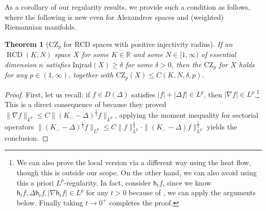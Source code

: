 \documentclass[11pt,reqno]{amsart}
\newtheorem{theorem}{Theorem}[section]
\theoremstyle{definition}
\numberwithin{equation}{section}
\DeclareMathOperator{\RCD}{RCD}
\begin{document}
As a corollary of our regularity results, we provide such a condition as follows, where the following is new even for Alexandrov spaces and (weighted) Riemannian manifolds.
\begin{theorem}[$\mathrm{CZ}_p$ for RCD spaces with positive injectivity radius]\label{thmcz}
    If an $\RCD(K, N)$ space $X$ for some $K \in \mathbb{R}$ and some $N \in [1, \infty)$ of essential dimension $n$ satisfies
    $
        \mathrm{Injrad}(X)\ge \delta$ for some $\delta>0$,  then the $\mathrm{CZ}_p$ for $X$ holds for any $p \in (1, \infty)$, together with $\mathrm{CZ}_p(X) \le C(K, N, \delta, p)$. 
\end{theorem}
\begin{proof}
First, let us recall: if $f \in D(\Delta)$ satisfies $|f|+|\Delta f| \in L^p$, then $|\nabla f| \in L^p$.\footnote{We can also prove the local version via a different way using the heat flow, though this is outside our scope. On the other hand, we can also avoid using this a priori $L^p$-regularity. In fact, consider $\mathsf{h}_tf$, since we know $\mathsf{h}_tf, \Delta \mathsf{h}_tf, |\nabla \mathsf{h}_tf| \in L^p$ for any $t>0$ because of \cite{JiangLiZhang}, we can apply the arguments below. Finally taking $t \to 0^+$ completes the proof.} This is a direct consequence of \cite{CTT} because they proved $\|\nabla f\|_{L^p}\le C \|(K_--\Delta)^{\frac{1}{2}}f\|_{L^p}$,   applying the moment inequality for sectorial operators  $\|(K_--\Delta)^{\frac{1}{2}}f\|_{L^p} \le C\|f\|_{L^p}^{\frac{1}{2}}\cdot \|(K_--\Delta)f\|_{L^p}^{\frac{1}{2}} $ yields the conclusion.


\end{proof}
\end{document}
